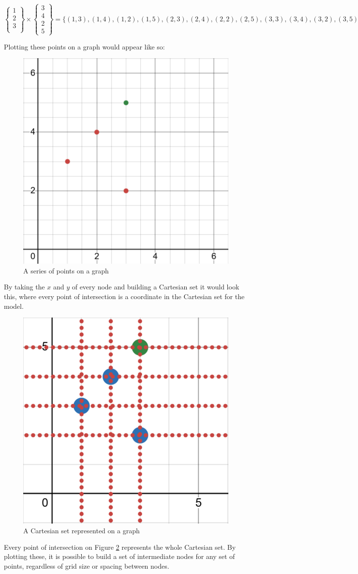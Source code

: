 \[
\left\{
\begin{array}{c}
1 \\
2 \\
3 \\
\end{array}
\right\} \times
\left\{
\begin{array}{c}
3 \\
4 \\
2 \\
5
\end{array}
\right\} = \{(1,3), (1,4), (1,2), (1,5), (2,3), (2,4),(2,2), (2,5), (3,3),(3,4),(3,2),(3,5)\}
\]

Plotting these points on a graph would appear like so:
\begin{figure}[H]
    \centering
    \includegraphics[width=0.4\linewidth]{cartesianpointsonagraph.png}
    \caption{A series of points on a graph}
    \label{fig:cartesianpointsonagraph}
\end{figure}
By taking the $x$ and $y$ of every node and building a Cartesian set it would look this, where every point of intersection is a coordinate in the Cartesian set for the model.
\begin{figure}[H]
    \centering
    \includegraphics[width=0.4\linewidth]{cartesiansetonagraph.png}
    \caption{A Cartesian set represented on a graph}
    \label{fig:cartesiansetonagraph}
\end{figure}
Every point of intersection on Figure \ref{fig:cartesiansetonagraph} represents the whole Cartesian set. By plotting these, it is possible to build a set of intermediate nodes for any set of points, regardless of grid size or spacing between nodes.

